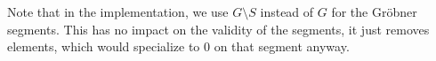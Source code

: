 \documentclass[a4paper, 12pt]{article}
\DeclareMathOperator{\LC}{lc}
\DeclareMathOperator{\lcm}{lcm}
\theoremstyle{changedot}
\theoremstyle{changedotbreak}
\theoremstyle{nonumberplain}
\newtheorem{proof}{Proof}
\begin{document}
Note that in the implementation, we use $G \setminus S$ instead of $G$ for the Gröbner segments. This has no impact on the validity of the segments, it just removes elements, which would specialize to 0 on that segment anyway.






\end{document}
